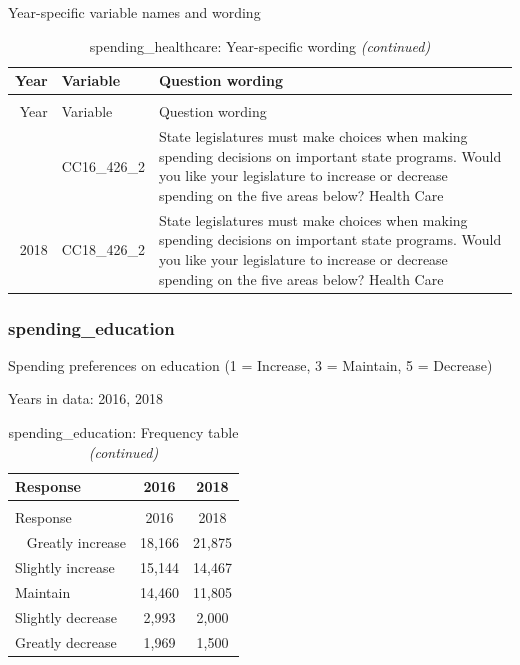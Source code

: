 \documentclass[12pt]{article}
\begin{document}
\endgroup{}

Year-specific variable names and wording

\begin{longtable}[t]{rl>{\raggedright\arraybackslash}p{10cm}}
\caption{\label{tab:unnamed-chunk-4}spending\_healthcare: Year-specific wording}\\
\toprule
Year & Variable & Question wording\\
\midrule
\endfirsthead
\caption[]{spending\_healthcare: Year-specific wording \textit{(continued)}}\\
\toprule
Year & Variable & Question wording\\
\midrule
\endhead
\
\endfoot
\bottomrule
\endlastfoot
2016 & CC16\_426\_2 & State legislatures must make choices when making spending decisions on important state programs. Would you like your legislature to increase or decrease spending on the five areas below? Health Care\\
2018 & CC18\_426\_2 & State legislatures must make choices when making spending decisions on important state programs. Would you like your legislature to increase or decrease spending on the five areas below? Health Care\\*
\end{longtable}

\subsubsection{spending\_education}\label{spending_education}

Spending preferences on education (1 = Increase, 3 = Maintain, 5 =
Decrease)

Years in data: 2016, 2018\begingroup\fontsize{10}{12}\selectfont

\begin{longtable}[t]{lcc}
\caption{\label{tab:unnamed-chunk-4}spending\_education: Frequency table}\\
\toprule
Response & 2016 & 2018\\
\midrule
\endfirsthead
\caption[]{spending\_education: Frequency table \textit{(continued)}}\\
\toprule
Response & 2016 & 2018\\
\midrule
\endhead
\
\endfoot
\bottomrule
\endlastfoot
Greatly increase & 18,166 & 21,875\\
Slightly increase & 15,144 & 14,467\\
Maintain & 14,460 & 11,805\\
Slightly decrease & 2,993 & 2,000\\
Greatly decrease & 1,969 & 1,500\\*
\end{longtable}
\end{document}
